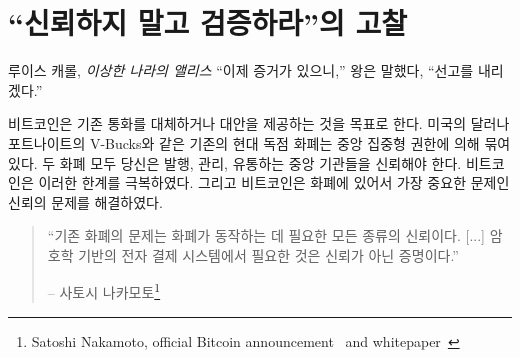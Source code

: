 \chapter{ \enquote{신뢰하지 말고 검증하라}의 고찰}
\label{les:16}

\begin{comment}
	\begin{chapquote}{Lewis Carroll, \textit{Alice in Wonderland}}
		\enquote{Now for the evidence,} said the King, \enquote{and then the sentence.}
	\end{chapquote}
\end{comment}
\begin{chapquote}{루이스 캐롤, \textit{이상한 나라의 앨리스}}
	\enquote{이제 증거가 있으니,} 왕은 말했다, \enquote{선고를 내리겠다.}
\end{chapquote}

\begin{comment}
	Bitcoin aims to replace, or at least provide an alternative to,
	conventional currency. Conventional currency is bound to a centralized
	authority, no matter if we are talking about legal tender like the US
	dollar or modern monopoly money like Fortnite's V-Bucks. In both
	examples, you are bound to trust the central authority to issue, manage
	and circulate your money. Bitcoin unties this bound, and the main issue
	Bitcoin solves is the issue of \textit{trust}.
\end{comment}
비트코인은 기존 통화를 대체하거나 대안을 제공하는 것을 목표로 한다.
미국의 달러나 포트나이트의 V-Bucks와 같은 기존의 현대 독점 화폐는 
중앙 집중형 권한에 의해 묶여있다.
두 화폐 모두 당신은 발행, 관리, 유통하는 중앙 기관들을 신뢰해야 한다.
비트코인은 이러한 한계를 극복하였다.
그리고 비트코인은 화폐에 있어서 가장 중요한 문제인 신뢰의 문제를 해결하였다.



\begin{quotation}\begin{samepage}
		\enquote{기존 화폐의 문제는 화폐가 동작하는 데 필요한 모든 종류의 신뢰이다. [...] 
			암호학 기반의 전자 결제 시스템에서 필요한 것은 신뢰가 아닌 증명이다.}
		\begin{flushright} -- 사토시 나카모토\footnote{Satoshi Nakamoto, official Bitcoin announcement~\cite{bitcoin-announcement} and whitepaper~\cite{whitepaper}}
\end{flushright}\end{samepage}\end{quotation}

